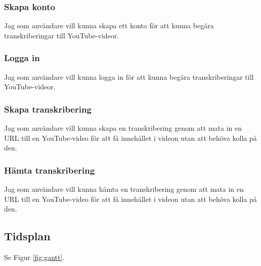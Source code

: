 \subsubsection{Skapa konto}
Jag som användare vill kunna skapa ett konto för att kunna begära
transkriberingar till YouTube-videor.

\subsubsection{Logga in}
Jag som användare vill kunna logga in för att kunna begära transkriberingar
till YouTube-videor.

\subsubsection{Skapa transkribering}
Jag som användare vill kunna skapa en transkribering genom att mata in en URL
till en YouTube-video för att få innehållet i videon utan att behöva kolla på
den.

\subsubsection{Hämta transkribering}
Jag som användare vill kunna hämta en transkribering genom att mata in en URL
till en YouTube-video för att få innehållet i videon utan att behöva kolla på
den.

\subsection{Tidsplan}
Se Figur \ref{fig:gantt}.